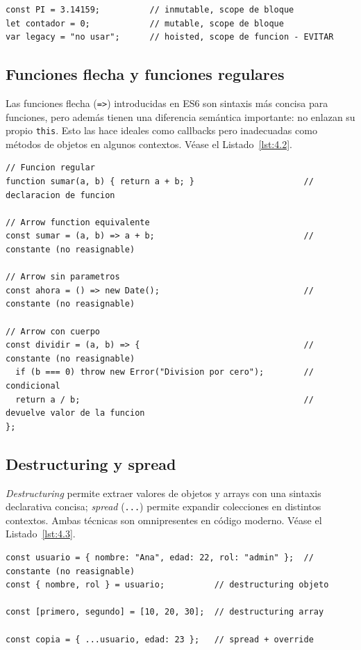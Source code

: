 \begin{lstlisting}[style=js,numbers=none,caption={Ejemplo de JavaScript},label=lst:4.1]
const PI = 3.14159;          // inmutable, scope de bloque
let contador = 0;            // mutable, scope de bloque
var legacy = "no usar";      // hoisted, scope de funcion - EVITAR
\end{lstlisting}

\subsection{Funciones flecha y funciones regulares}

Las funciones flecha (\texttt{=>}) introducidas en ES6 son
sintaxis más concisa para funciones, pero además tienen una
diferencia semántica importante: no enlazan su propio
\texttt{this}. Esto las hace ideales como callbacks pero
inadecuadas como métodos de objetos en algunos contextos. V\'ease el Listado~\ref{lst:4.2}.


\begin{lstlisting}[style=js,numbers=none,caption={Ejemplo de JavaScript},label=lst:4.2]
// Funcion regular
function sumar(a, b) { return a + b; }                      // declaracion de funcion

// Arrow function equivalente
const sumar = (a, b) => a + b;                              // constante (no reasignable)

// Arrow sin parametros
const ahora = () => new Date();                             // constante (no reasignable)

// Arrow con cuerpo
const dividir = (a, b) => {                                 // constante (no reasignable)
  if (b === 0) throw new Error("Division por cero");        // condicional
  return a / b;                                             // devuelve valor de la funcion
};
\end{lstlisting}

\subsection{Destructuring y spread}

\emph{Destructuring} permite extraer valores de objetos y
arrays con una sintaxis declarativa concisa; \emph{spread}
(\texttt{...}) permite expandir colecciones en distintos
contextos. Ambas técnicas son omnipresentes en código moderno. V\'ease el Listado~\ref{lst:4.3}.


\begin{lstlisting}[style=js,numbers=none,caption={Ejemplo de JavaScript},label=lst:4.3]
const usuario = { nombre: "Ana", edad: 22, rol: "admin" };  // constante (no reasignable)
const { nombre, rol } = usuario;          // destructuring objeto

const [primero, segundo] = [10, 20, 30];  // destructuring array

const copia = { ...usuario, edad: 23 };   // spread + override
\end{lstlisting}

